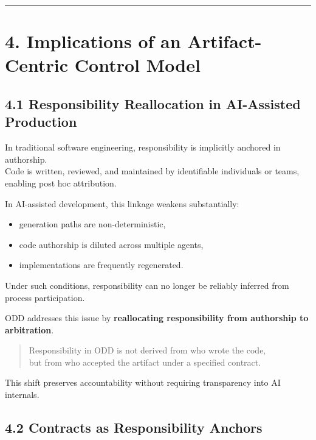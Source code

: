 \documentclass[
]{article}
\begin{document}
\begin{center}\rule{0.5\linewidth}{0.5pt}\end{center}

\hypertarget{4-implications-of-an-artifact-centric-control-model}{%
\section{4. Implications of an Artifact-Centric Control
Model}\label{4-implications-of-an-artifact-centric-control-model}}

\hypertarget{41-responsibility-reallocation-in-ai-assisted-production}{%
\subsection{4.1 Responsibility Reallocation in AI-Assisted
Production}\label{41-responsibility-reallocation-in-ai-assisted-production}}

In traditional software engineering, responsibility is implicitly
anchored in authorship.\\
Code is written, reviewed, and maintained by identifiable individuals or
teams, enabling post hoc attribution.

In AI-assisted development, this linkage weakens substantially:

\begin{itemize}
\item
  generation paths are non-deterministic,
\item
  code authorship is diluted across multiple agents,
\item
  implementations are frequently regenerated.
\end{itemize}

Under such conditions, responsibility can no longer be reliably inferred
from process participation.

ODD addresses this issue by \textbf{reallocating responsibility from
authorship to arbitration}.

\begin{quote}
Responsibility in ODD is not derived from who wrote the code,\\
but from who accepted the artifact under a specified contract.
\end{quote}

This shift preserves accountability without requiring transparency into
AI internals.

\hypertarget{42-contracts-as-responsibility-anchors}{%
\subsection{4.2 Contracts as Responsibility
Anchors}\label{42-contracts-as-responsibility-anchors}}
\end{document}
